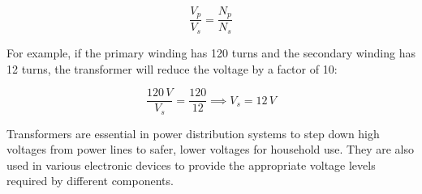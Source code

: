 \[
\frac{V_p}{V_s} = \frac{N_p}{N_s}
\]

For example, if the primary winding has 120 turns and the secondary winding has 12 turns, the transformer will reduce the voltage by a factor of 10:

\[
\frac{120\,V}{V_s} = \frac{120}{12} \implies V_s = 12\,V
\]

Transformers are essential in power distribution systems to step down high voltages from power lines to safer, lower voltages for household use. They are also used in various electronic devices to provide the appropriate voltage levels required by different components.

